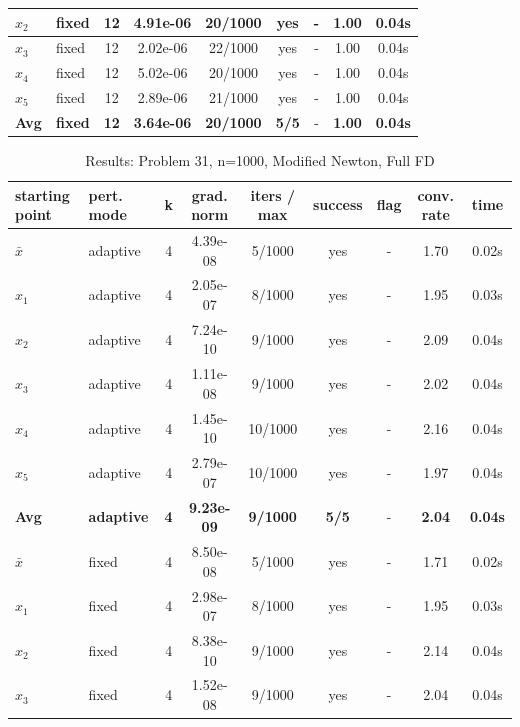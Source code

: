 \begin{longtable}{|l|l|c|c|c|c|c|c|c|}
\hline
$x_2$ & fixed & 12 & 4.91e-06 & 20/1000 & yes & - & 1.00 & 0.04s \\
\hline
$x_3$ & fixed & 12 & 2.02e-06 & 22/1000 & yes & - & 1.00 & 0.04s \\
\hline
$x_4$ & fixed & 12 & 5.02e-06 & 20/1000 & yes & - & 1.00 & 0.04s \\
\hline
$x_5$ & fixed & 12 & 2.89e-06 & 21/1000 & yes & - & 1.00 & 0.04s \\
\hline
\hline\hline
\textbf{Avg} & \textbf{fixed} & \textbf{12} & \textbf{3.64e-06} & \textbf{20/1000} & \textbf{5/5} & - & \textbf{1.00} & \textbf{0.04s} \\
\hline\hline
\end{longtable}


\begin{longtable}{|l|l|c|c|c|c|c|c|c|}
\caption{Results: Problem 31, n=1000, Modified Newton, Full FD} \\
\hline
\textbf{starting point} & \textbf{pert. mode} & \textbf{k} & \textbf{grad. norm} & \textbf{iters / max} & \textbf{success} & \textbf{flag} & \textbf{conv. rate} & \textbf{time} \\
\hline
\endfirsthead
\endhead
\endfoot
\hline
\endlastfoot
$\bar{x}$ & adaptive & 4 & 4.39e-08 & 5/1000 & yes & - & 1.70 & 0.02s \\
\hline
$x_1$ & adaptive & 4 & 2.05e-07 & 8/1000 & yes & - & 1.95 & 0.03s \\
\hline
$x_2$ & adaptive & 4 & 7.24e-10 & 9/1000 & yes & - & 2.09 & 0.04s \\
\hline
$x_3$ & adaptive & 4 & 1.11e-08 & 9/1000 & yes & - & 2.02 & 0.04s \\
\hline
$x_4$ & adaptive & 4 & 1.45e-10 & 10/1000 & yes & - & 2.16 & 0.04s \\
\hline
$x_5$ & adaptive & 4 & 2.79e-07 & 10/1000 & yes & - & 1.97 & 0.04s \\
\hline
\hline\hline
\textbf{Avg} & \textbf{adaptive} & \textbf{4} & \textbf{9.23e-09} & \textbf{9/1000} & \textbf{5/5} & - & \textbf{2.04} & \textbf{0.04s} \\
\hline\hline
\hline
$\bar{x}$ & fixed & 4 & 8.50e-08 & 5/1000 & yes & - & 1.71 & 0.02s \\
\hline
$x_1$ & fixed & 4 & 2.98e-07 & 8/1000 & yes & - & 1.95 & 0.03s \\
\hline
$x_2$ & fixed & 4 & 8.38e-10 & 9/1000 & yes & - & 2.14 & 0.04s \\
\hline
$x_3$ & fixed & 4 & 1.52e-08 & 9/1000 & yes & - & 2.04 & 0.04s \\

\end{longtable}
